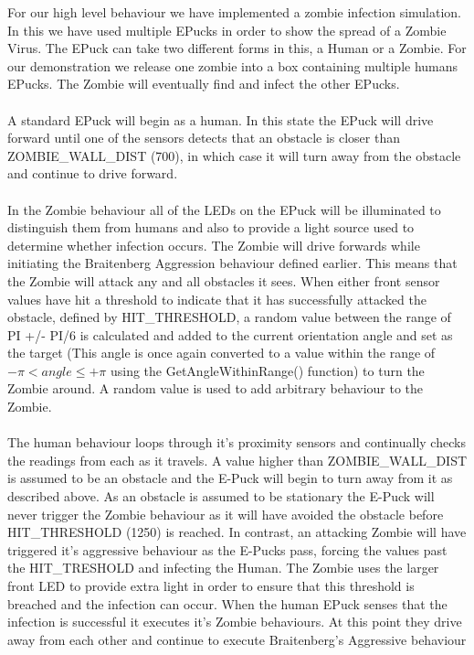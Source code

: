 \documentclass[11pt]{article}
\begin{document}
For our high level behaviour we have implemented a zombie infection simulation. In this we have used multiple E\-Pucks in order to show the spread of a Zombie Virus. The E\-Puck can take two different forms in this, a Human or a Zombie. For our demonstration we release one zombie into a box containing multiple humans E\-Pucks. The Zombie will eventually find and infect the other E\-Pucks.
\\
\\
A standard E\-Puck will begin as a human. In this state the E\-Puck will drive forward until one of the sensors detects that an obstacle is closer than ZOMBIE\_WALL\_DIST (700), in which case it will turn away from the obstacle and continue to drive forward. 
\\
\\
In the Zombie behaviour all of the LEDs on the E\-Puck will be illuminated to distinguish them from humans and also to provide a light source used to determine whether infection occurs. The Zombie will drive forwards while initiating the Braitenberg Aggression behaviour defined earlier. This means that the Zombie will attack any and all obstacles it sees. When either front sensor values have hit a threshold to indicate that it has successfully attacked the obstacle, defined by HIT\_THRESHOLD, a random value between the range of  PI +/- PI/6 is calculated and added to the current orientation angle and set as the target (This angle is once again converted to a value within the range of \begin{math}-\pi < angle \leq +\pi\end{math} using the GetAngleWithinRange() function) to turn the Zombie around. A random value is used to add arbitrary behaviour to the Zombie.
\\
\\
The human behaviour loops through it’s proximity sensors and continually checks the readings from each as it travels. A value higher than ZOMBIE\_WALL\_DIST is assumed to be an obstacle and the E-Puck will begin to turn away from it as described above. As an obstacle is assumed to be stationary the E-Puck will never trigger the Zombie behaviour as it will have avoided the obstacle before HIT\_THRESHOLD (1250) is reached. In contrast, an attacking Zombie will have triggered it’s aggressive behaviour as the E-Pucks pass, forcing the values past the HIT\_TRESHOLD and infecting the Human. The Zombie uses the larger front LED to provide extra light in order to ensure that this threshold is breached and the infection can occur. When the human E\-Puck senses that the infection is successful it executes it’s Zombie behaviours. At this point they drive away from each other and continue to execute Braitenberg’s Aggressive behaviour
\end{document}
